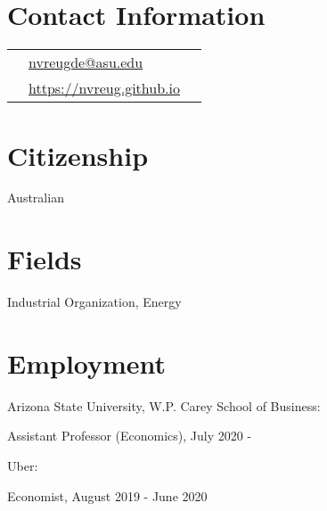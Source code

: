 \documentclass[margin,line]{res}
\newenvironment{list1}{
  \begin{list}{\ding{113}}{%
      \setlength{\itemsep}{.025in}
      \setlength{\parsep}{0in} \setlength{\parskip}{0in}
      \setlength{\topsep}{0in} \setlength{\partopsep}{0in}
      \setlength{\leftmargin}{0.17in}}}{\end{list}}
\begin{document}

~\\
~\\

\begin{resume}
\thispagestyle{plain} %

\section{ Contact Information}
\vspace{.05in}
\begin{tabular}{@{}p{0.20in}p{2.75in}p{2.75in}}
 &  \href{mailto: nvreugde@asu.edu}{nvreugde@asu.edu}   & \\
 &\href{https://nvreug.github.io}{https://nvreug.github.io} & \\ 
\end{tabular}

\section{Citizenship}
\begin{list1}
	\item[] Australian
	\vspace*{.05in}
\end{list1}

\section{ Fields}
\begin{list1}
\item[] Industrial Organization, Energy
\vspace*{.05in}
\end{list1}

\section{ Employment}
\begin{list1}
	\item[] Arizona State University, W.P. Carey School of Business: 
	\item[] \hspace{11pt} Assistant Professor (Economics), July 2020 -
	\item[] Uber: 
	\item[] \hspace{11pt} Economist, August 2019 - June 2020
	\vspace*{.05in}
\end{list1}


\end{resume}
\end{document}

